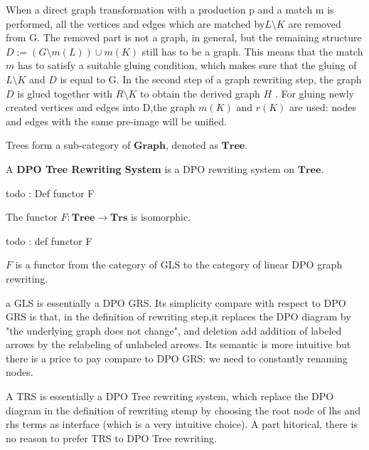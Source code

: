     When a direct graph transformation with a production p and a match m is performed, all the vertices and edges which are matched by$ L \mathop{\setminus} K$ are removed from G. The removed part is not a graph, in general, but the remaining structure $D := (G \mathop{\setminus} m(L)) \mathop{\cup}  m(K)$ still has to be a graph. This means that the match $m$ has to satisfy a suitable gluing condition, which makes sure that the gluing of $L\mathop{\setminus} K$ and $D$ is equal to G. In the second step of a graph rewriting step, the graph $D$ is glued together with $R \mathop{\setminus} K$ to obtain the derived graph $H$ . For gluing newly created vertices and edges into D,the graph $m(K)$ and $r(K)$ are used: nodes and edges with the same pre-image will be unified.
    
    Trees form a sub-category of $\mathbf{Graph}$, denoted as $\mathbf{Tree}$.
    \begin{definition}
       A \textbf{DPO Tree Rewriting System} is a DPO rewriting system on $\mathbf{Tree}$.
    \end{definition}
    
    todo : Def functor F
    \begin{proposition} 
       The functor $F: \mathbf{Tree} \mathop{\to} \mathbf{Trs}$ is isomorphic.
    \end{proposition}
    todo : def functor F
    \begin{proposition}
       
       $F$ is a functor from the category of GLS to the category of linear DPO graph rewriting.
    \end{proposition}
    
    \begin{remark}
       a GLS is essentially a DPO GRS. Its simplicity compare with respect to DPO GRS is that, in the definition of rewriting step,it replaces the DPO diagram by "the underlying graph does not change", and deletion add addition of labeled arrows by the relabeling of unlabeled arrows. Its semantic is more intuitive but there is a price to pay compare to DPO GRS: we need to constantly renaming nodes. 
    \end{remark}
    
    \begin{remark}
      A TRS is essentially a DPO Tree rewriting system, which replace the DPO diagram in the definition of rewriting stemp by choosing the root node of lhs and rhs terms as interface (which is a very intuitive choice). A part hitorical, there is no reason to prefer TRS to DPO Tree rewriting.
    \end{remark}
    \color{black} 
    
